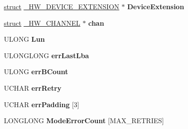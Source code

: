 \begin{DoxyCompactItemize}
\begin{tabbing}
\end{tabbing}\item 
\mbox{\label{struct___h_w___l_u___e_x_t_e_n_s_i_o_n_a3a200eb989fa40d2c1e85e8c0a952f53}} 
\hyperlink{interfacestruct}{struct} \hyperlink{struct___h_w___d_e_v_i_c_e___e_x_t_e_n_s_i_o_n}{\+\_\+\+H\+W\+\_\+\+D\+E\+V\+I\+C\+E\+\_\+\+E\+X\+T\+E\+N\+S\+I\+ON} $\ast$ {\bfseries Device\+Extension}
\item 
\mbox{\label{struct___h_w___l_u___e_x_t_e_n_s_i_o_n_a3a610daf1e72b2273b4b5d17a5590299}} 
\hyperlink{interfacestruct}{struct} \hyperlink{struct___h_w___c_h_a_n_n_e_l}{\+\_\+\+H\+W\+\_\+\+C\+H\+A\+N\+N\+EL} $\ast$ {\bfseries chan}
\item 
\mbox{\label{struct___h_w___l_u___e_x_t_e_n_s_i_o_n_a7182e933500a0948c85d7ac968e3161a}} 
U\+L\+O\+NG {\bfseries Lun}
\item 
\mbox{\label{struct___h_w___l_u___e_x_t_e_n_s_i_o_n_a6e71dcb12a9d7d9282a4457ac72d026a}} 
U\+L\+O\+N\+G\+L\+O\+NG {\bfseries err\+Last\+Lba}
\item 
\mbox{\label{struct___h_w___l_u___e_x_t_e_n_s_i_o_n_a2c6043ec340bfe6e28d2a97f90a9a549}} 
U\+L\+O\+NG {\bfseries err\+B\+Count}
\item 
\mbox{\label{struct___h_w___l_u___e_x_t_e_n_s_i_o_n_a3ee4956d3eb3598d005e81e3e486e2ba}} 
U\+C\+H\+AR {\bfseries err\+Retry}
\item 
\mbox{\label{struct___h_w___l_u___e_x_t_e_n_s_i_o_n_a40fb838c2edb99bb078a7497dc822838}} 
U\+C\+H\+AR {\bfseries err\+Padding} \mbox{[}3\mbox{]}
\item 
\mbox{\label{struct___h_w___l_u___e_x_t_e_n_s_i_o_n_a637496ea8bb6134e40011ca7422d8740}} 
L\+O\+N\+G\+L\+O\+NG {\bfseries Mode\+Error\+Count} \mbox{[}M\+A\+X\+\_\+\+R\+E\+T\+R\+I\+ES\mbox{]}
\item 
\mbox{\label{struct___h_w___l_u___e_x_t_e_n_s_i_o_n_a9d85c78ba63884c95a9ad0db86009f57}} 

\end{DoxyCompactItemize}
